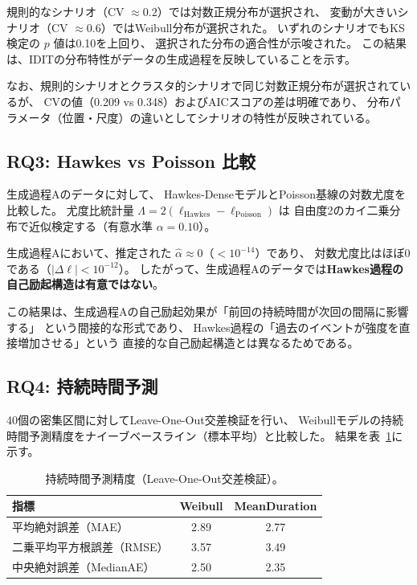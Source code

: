 規則的なシナリオ（CV $\approx 0.2$）では対数正規分布が選択され、
変動が大きいシナリオ（CV $\approx 0.6$）ではWeibull分布が選択された。
いずれのシナリオでもKS検定の $p$ 値は0.10を上回り、
選択された分布の適合性が示唆された。
この結果は、IDITの分布特性がデータの生成過程を反映していることを示す。

なお、規則的シナリオとクラスタ的シナリオで同じ対数正規分布が選択されているが、
CVの値（0.209 vs 0.348）およびAICスコアの差は明確であり、
分布パラメータ（位置・尺度）の違いとしてシナリオの特性が反映されている。

\subsection{RQ3: Hawkes vs Poisson 比較}

生成過程Aのデータに対して、
Hawkes-DenseモデルとPoisson基線の対数尤度を比較した。
尤度比統計量 $\Lambda = 2(\ell_{\text{Hawkes}} - \ell_{\text{Poisson}})$ は
自由度2のカイ二乗分布で近似検定する（有意水準 $\alpha = 0.10$）。

生成過程Aにおいて、推定された $\hat{\alpha} \approx 0$（$< 10^{-14}$）であり、
対数尤度比はほぼ0である（$|\Delta\ell| < 10^{-12}$）。
したがって、生成過程Aのデータでは\textbf{Hawkes過程の自己励起構造は有意ではない}。

この結果は、生成過程Aの自己励起効果が「前回の持続時間が次回の間隔に影響する」
という間接的な形式であり、
Hawkes過程の「過去のイベントが強度を直接増加させる」という
直接的な自己励起構造とは異なるためである。

\subsection{RQ4: 持続時間予測}

40個の密集区間に対してLeave-One-Out交差検証を行い、
Weibullモデルの持続時間予測精度をナイーブベースライン（標本平均）と比較した。
結果を表~\ref{tab:duration}に示す。

\begin{table}[t]
  \centering
  \caption{持続時間予測精度（Leave-One-Out交差検証）。}
  \label{tab:duration}
  \begin{tabular}{lcc}
    \toprule
    指標 & Weibull & MeanDuration \\
    \midrule
    平均絶対誤差（MAE） & 2.89 & 2.77 \\
    二乗平均平方根誤差（RMSE） & 3.57 & 3.49 \\
    中央絶対誤差（MedianAE） & 2.50 & 2.35 \\
    \bottomrule
  \end{tabular}
\end{table}


